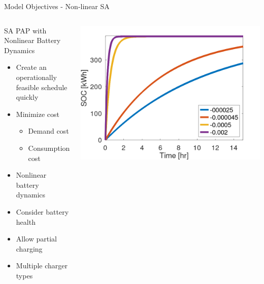 \documentclass[aspectratio=169,dvipsnames]{beamer}
\begin{document}
\begin{frame}[label={sec:org960f3d3}]{Model Objectives - Non-linear SA}
\begin{columns}
\begin{column}{0.5\columnwidth}
\begin{alertblock}{SA PAP with Nonlinear Battery Dynamics}
{\footnotesize
\begin{itemize}
\item Create an operationally feasible schedule quickly
\item Minimize cost
\begin{itemize}
\item Demand cost
\item Consumption cost
\end{itemize}
\item Nonlinear battery dynamics
\item Consider battery health
\item Allow partial charging
\item Multiple charger types
\end{itemize}
}
\end{alertblock}
\end{column}

\begin{column}{0.5\columnwidth}
\begin{center}
\includegraphics[width=.9\linewidth]{./img/nonlinear-bat.png}
\end{center}
\end{column}
\end{columns}
\end{frame}
\end{document}
